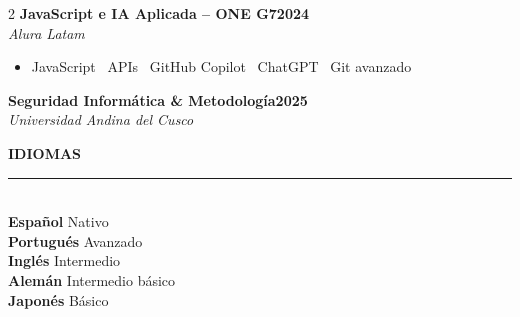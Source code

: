 \documentclass[letterpaper,10pt]{article}
\newcommand{\rsection}[1]{%
  {\vspace{2pt}\color{accentblue}\bfseries\normalsize\MakeUppercase{#1}}\\[-2pt]
  {\color{cvline}\rule{\linewidth}{0.6pt}}\\[1pt]
}
\newcommand{\cvcertfull}[4]{%
  \vspace{2pt}
  {\footnotesize\textbf{#1}\hfill\footnotesize\textbf{#2}}\\
  {\scriptsize\color{graytext}\textit{#3}\hfill\scriptsize\color{graytext}\textit{#4}}
  \vspace{0pt}
}
\newcommand{\cvbullet}{\begin{itemize}[leftmargin=0.15in,itemsep=-1pt,topsep=1pt]}
\newcommand{\cvbulletend}{\end{itemize}\vspace{2pt}}
\begin{document}
\begin{paracol}{2}
\cvcertfull{JavaScript e IA Aplicada -- ONE G7}{2024}
{Alura Latam}{}
\cvbullet
  \item[\small\textbullet] {\scriptsize JavaScript \textbullet\ APIs \textbullet\ GitHub Copilot \textbullet\ ChatGPT \textbullet\ Git avanzado}
\cvbulletend

\cvcertfull{Seguridad Inform\'atica \& Metodolog\'ia}{2025}
{Universidad Andina del Cusco}{}

\vspace{4pt}
\rsection{Idiomas}

{\footnotesize
\textbf{Espa\~nol} \hfill Nativo\\[2pt]
\textbf{Portugu\'es} \hfill Avanzado\\[2pt]
\textbf{Ingl\'es} \hfill Intermedio\\[2pt]
\textbf{Alem\'an} \hfill Intermedio b\'asico\\[2pt]
\textbf{Japon\'es} \hfill B\'asico
}

\end{paracol}
\end{document}
